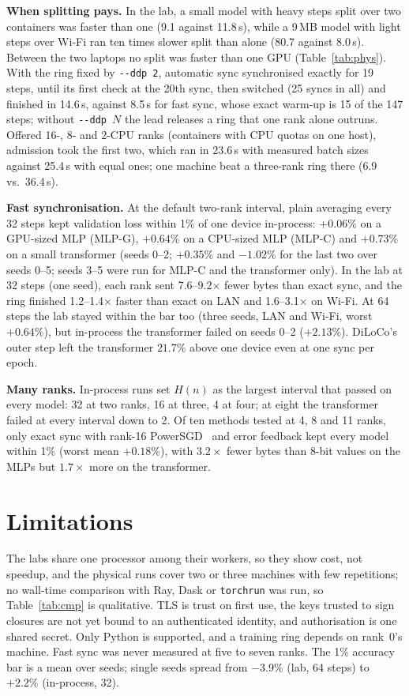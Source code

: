 \documentclass[conference]{IEEEtran}
\begin{document}
\textbf{When splitting pays.} In the lab, a small model with heavy steps split
over two containers was faster than one (9.1 against 11.8\,s), while a 9\,MB model with
light steps over Wi-Fi ran ten times slower split than alone (80.7 against
8.0\,s). Between the two laptops no split was faster than one GPU
(Table~\ref{tab:phys}). With the ring fixed by \texttt{-{}-ddp~2}, automatic sync
synchronised exactly for 19 steps, until its first check at the 20th sync,
then switched (25 syncs in all) and finished in 14.6\,s, against 8.5\,s for fast sync, whose exact warm-up is
15 of the 147 steps; without \texttt{-{}-ddp~$N$} the lead releases a ring that one rank
alone outruns. Offered 16-, 8- and 2-CPU ranks (containers with CPU quotas
on one host), admission took the first two, which ran in 23.6\,s with measured batch sizes against
25.4\,s with equal ones; one machine beat a three-rank ring there (6.9 vs.\ 36.4\,s).

\textbf{Fast synchronisation.} At the default two-rank interval, plain
averaging every 32 steps kept validation loss within
1\% of one device in-process: $+0.06\%$ on a GPU-sized MLP (MLP-G), $+0.64\%$
on a CPU-sized MLP (MLP-C) and $+0.73\%$ on a small transformer (seeds 0--2;
$+0.35\%$ and $-1.02\%$ for the last two over seeds 0--5; seeds 3--5 were run
for MLP-C and the transformer only). In the lab at 32
steps (one seed), each rank sent 7.6--9.2$\times$ fewer bytes than
exact sync, and the ring finished 1.2--1.4$\times$ faster than exact on LAN and
1.6--3.1$\times$ on Wi-Fi. At 64 steps the lab stayed within the bar too
(three seeds, LAN and Wi-Fi, worst $+0.64\%$), but in-process the transformer
failed on seeds 0--2 ($+2.13\%$). DiLoCo's outer
step left the transformer $21.7\%$ above one device even at one sync per
epoch.

\textbf{Many ranks.} In-process runs set $H(n)$ as the largest interval that
passed on every model: 32 at two ranks, 16 at three, 4 at four; at eight the
transformer failed at every interval down to 2. Of ten methods tested at 4, 8
and 11 ranks, only exact sync with rank-16 PowerSGD~\cite{vogels2019powersgd}
and error feedback kept every model within 1\% (worst mean $+0.18\%$), with
$3.2\times$ fewer bytes than 8-bit values on the MLPs but $1.7\times$ more on
the transformer.

\section{Limitations}

The labs share one processor among their workers, so they show cost, not
speedup, and the physical runs cover two or three machines with few repetitions;
no wall-time comparison with Ray, Dask or \texttt{torchrun} was run, so
Table~\ref{tab:cmp} is qualitative.
TLS is trust on first use, the keys trusted to sign closures are not yet bound to
an authenticated identity, and authorisation is one shared secret. Only Python is
supported, and a training ring depends on rank~0's machine. Fast sync was never
measured at five to seven ranks. The 1\% accuracy
bar is a mean over seeds; single seeds spread from $-3.9\%$ (lab, 64 steps) to $+2.2\%$
(in-process, 32).
\end{document}
